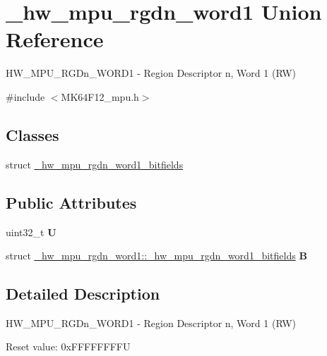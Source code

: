\hypertarget{union__hw__mpu__rgdn__word1}{}\section{\+\_\+hw\+\_\+mpu\+\_\+rgdn\+\_\+word1 Union Reference}
\label{union__hw__mpu__rgdn__word1}


H\+W\+\_\+\+M\+P\+U\+\_\+\+R\+G\+Dn\+\_\+\+W\+O\+R\+D1 -\/ Region Descriptor n, Word 1 (RW)  




{\ttfamily \#include $<$M\+K64\+F12\+\_\+mpu.\+h$>$}

\subsection*{Classes}
\begin{DoxyCompactItemize}
\item 
struct \hyperlink{struct__hw__mpu__rgdn__word1_1_1__hw__mpu__rgdn__word1__bitfields}{\+\_\+hw\+\_\+mpu\+\_\+rgdn\+\_\+word1\+\_\+bitfields}
\end{DoxyCompactItemize}
\subsection*{Public Attributes}
\begin{DoxyCompactItemize}
\item 
uint32\+\_\+t {\bfseries U}\hypertarget{union__hw__mpu__rgdn__word1_ad07fc640f5a5638f92b9cabdfa8ae4ac}{}\label{union__hw__mpu__rgdn__word1_ad07fc640f5a5638f92b9cabdfa8ae4ac}

\item 
struct \hyperlink{struct__hw__mpu__rgdn__word1_1_1__hw__mpu__rgdn__word1__bitfields}{\+\_\+hw\+\_\+mpu\+\_\+rgdn\+\_\+word1\+::\+\_\+hw\+\_\+mpu\+\_\+rgdn\+\_\+word1\+\_\+bitfields} {\bfseries B}\hypertarget{union__hw__mpu__rgdn__word1_af6dc10642eeb51e0cfb0aac9e1b4c295}{}\label{union__hw__mpu__rgdn__word1_af6dc10642eeb51e0cfb0aac9e1b4c295}

\end{DoxyCompactItemize}


\subsection{Detailed Description}
H\+W\+\_\+\+M\+P\+U\+\_\+\+R\+G\+Dn\+\_\+\+W\+O\+R\+D1 -\/ Region Descriptor n, Word 1 (RW) 

Reset value\+: 0x\+F\+F\+F\+F\+F\+F\+F\+FU

